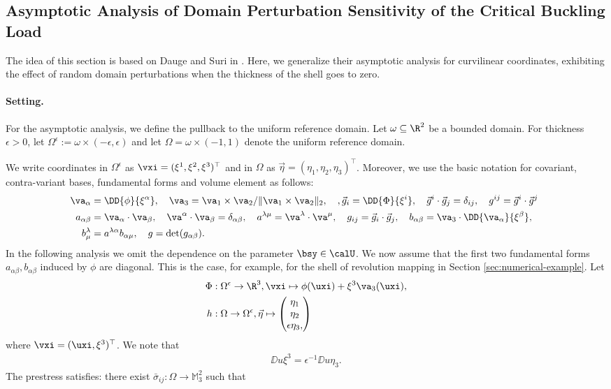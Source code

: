\subsection{Asymptotic Analysis of Domain Perturbation Sensitivity of the Critical Buckling Load}

The idea of this section is based on Dauge and Suri in \cite{dauge:hal-00012083}. Here, we generalize their asymptotic analysis for curvilinear coordinates, exhibiting the effect of random domain perturbations when the thickness of the shell goes to zero.
\paragraph{Setting.} For the asymptotic analysis, we define the pullback to the uniform reference domain. Let $\omega \subseteq \R^2 $ be a bounded domain. 
For thickness $\epsilon > 0$, let $\Omega^\epsilon := \omega \times (-\epsilon, \epsilon)$ and let $\Omega = \omega \times (-1,1)$ denote the uniform reference domain.

We write coordinates in $\Omega^\epsilon$ as $\vxi = (\xi^1, \xi^2, \xi^3)^\top$ and in $\Omega$ as $\vec \eta  = (\eta_1,\eta_2,\eta_3)^\top$. Moreover, we use the basic notation for covariant, contra-variant bases, fundamental forms and volume element 
as follows:
\begin{align*}
    \va_{\alpha} &= \DD{\phi}{\xi^\alpha} ,\quad  \va_3 = \va_1 \times \va_2 / \|  \va_1 \times \va_2  \|_2, \quad, \vec g_i  = \DD{\Phi}{\xi^i}, \quad \vec g^{i} \cdot \vec g_{j}= \delta_{ij}, \quad g^{ij}= \vec g^{i} \cdot \vec g^{j} \\\ 
    a_{\alpha\beta} &= \va_\alpha \cdot \va_\beta, \quad \va^\alpha \cdot \va_\beta = \delta_{\alpha\beta},\quad  a^{\lambda \mu}= \va^\lambda \cdot \va^\mu,
    \quad g_{ij} = \vec g_{i} \cdot \vec g_{j}, \quad  b_{\alpha\beta } = \va_3 \cdot \DD {\va_\alpha}{\xi^\beta} , \quad   
    \\ 
    b^\lambda_\mu &=  a^{\lambda \alpha} b_{\alpha \mu },\quad   g= \det (g_{\alpha \beta} ).
\end{align*}
In the following analysis we omit the dependence on the parameter $\bsy \in \calU$.
We now assume that the first two fundamental forms $a_{\alpha \beta}, b_{\alpha\beta}$ induced by $\phi$ are diagonal. This is the case, for example, for the shell of revolution mapping in Section \ref{sec:numerical-example}. 
Let 
\begin{align*}
\Phi&: \Omega^\epsilon \to \R^3, \vxi \mapsto \phi(\uxi) + \xi^3 \va_3(\uxi) , \\
h &: \Omega \to \Omega^\epsilon, \vec \eta \mapsto \begin{pmatrix}
    \eta_1 \\ \eta_2 \\ \epsilon \eta_3,
\end{pmatrix}\end{align*}
where $\vxi = (\uxi, \xi^3)^\top $. We note that 
\begin{align}\label{eq:eta3transform}
    \DD{u}{\xi^3} = \epsilon^{-1} \DD{u}{\eta_3}.
\end{align}
The prestress satisfies: there exist $\bar \sigma_{ij} : \Omega \to \mathbb{M}_{3}^2$ such that


